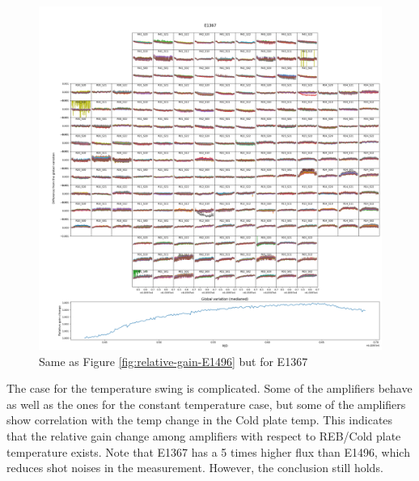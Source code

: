 \begin{figure}
    \centering
    \includegraphics[width=1\linewidth]{figures/gaintemp/E1367gainoverall_global.png}
    \caption{Same as Figure \ref{fig:relative-gain-E1496} but for E1367}
    \label{fig:relative-gain-E1367}
\end{figure} 
The case for the temperature swing is complicated. Some of the amplifiers behave as well as the ones for the constant temperature case, but some of the amplifiers show correlation with the temp change in the Cold plate temp. This indicates that the relative gain change among amplifiers with respect to REB/Cold plate temperature exists. 
Note that E1367 has a 5 times higher flux than E1496, which reduces shot noises in the measurement. However, the conclusion still holds. 

